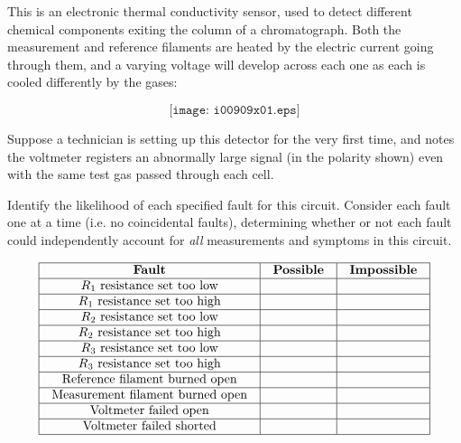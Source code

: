 

This is an electronic thermal conductivity sensor, used to detect different chemical components exiting the column of a chromatograph.  Both the measurement and reference filaments are heated by the electric current going through them, and a varying voltage will develop across each one as each is cooled differently by the gases:

$$\texttt{[image: i00909x01.eps]}$$

Suppose a technician is setting up this detector for the very first time, and notes the voltmeter registers an abnormally large signal (in the polarity shown) even with the same test gas passed through each cell.

Identify the likelihood of each specified fault for this circuit.  Consider each fault one at a time (i.e. no coincidental faults), determining whether or not each fault could independently account for {\it all} measurements and symptoms in this circuit.


$$\vbox{\offinterlineskip
\halign{\strut
\vrule \quad\hfil # \ \hfil & 
\vrule \quad\hfil # \ \hfil & 
\vrule \quad\hfil # \ \hfil \vrule \cr
\noalign{\hrule}
%
{\bf Fault} & {\bf Possible} & {\bf Impossible} \cr
%
\noalign{\hrule}
%
$R_1$ resistance set too low &  &  \cr
%
\noalign{\hrule}
%
$R_1$ resistance set too high &  &  \cr
%
\noalign{\hrule}
%
$R_2$ resistance set too low &  &  \cr
%
\noalign{\hrule}
%
$R_2$ resistance set too high &  &  \cr
%
\noalign{\hrule}
%
$R_3$ resistance set too low &  &  \cr
%
\noalign{\hrule}
%
$R_3$ resistance set too high &  &  \cr
%
\noalign{\hrule}
%
Reference filament burned open &  &  \cr
%
\noalign{\hrule}
%
Measurement filament burned open &  &  \cr
%
\noalign{\hrule}
%
Voltmeter failed open &  &  \cr
%
\noalign{\hrule}
%
Voltmeter failed shorted &  &  \cr
%
\noalign{\hrule}
} %
}$$ %







